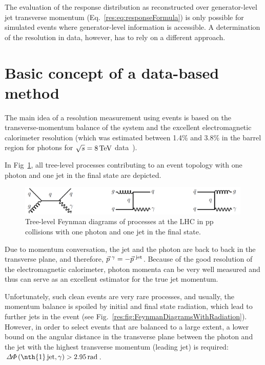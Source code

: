The evaluation of the response distribution as reconstructed over generator-level jet transverse momentum (Eq.~\eqref{res:eq:responseFormula})
is only possible for simulated events where generator-level information is accessible. 
A determination of the resolution in data, however, has to rely on a different approach.\\


\section{Basic concept of a data-based method}
The main idea of a resolution measurement using \GAMJET events is based on the transverse-momentum balance of the \GAMJET system and the excellent electromagnetic calorimeter resolution
(which was estimated between 1.4\% and 3.8\% in the barrel region for photons for $\sqrt{s}=8\,\text{Te}\kern-0.06667em\text{V}$ data~\cite{bib:CMS:PhotonIdentification_8TeV}).

In Fig~\ref{res:fig:FeynmanDiagrams}, all tree-level processes contributing to an event topology with one photon and one jet in the final state are depicted. 
\begin{figure}[t]
  \centering
      \includegraphics[width=0.99\textwidth]{figures/resolution/generalApproach/FeynmanDiagram.pdf}
  \caption{Tree-level Feynman diagrams of processes at the LHC in pp collisions with one photon and one jet in the final state.}  
  \label{res:fig:FeynmanDiagrams}
\end{figure}
Due to momentum conversation, the jet and the photon are back to back in the transverse plane, and therefore, $\vec{p}^{\,\,\gamma} = -\vec{p}^{\,\,\text{jet}}$. 
Because of the good resolution of the electromagnetic calorimeter, photon momenta can be very well measured 
and thus can serve as an excellent estimator for the true jet momentum.


Unfortunately, such clean events are very rare processes, and usually, the momentum balance is spoiled by initial and final state radiation, which lead to further jets in the event 
(see Fig.~\ref{res:fig:FeynmanDiagramsWithRadiation}). 
However, in order to select events that are balanced to a large extent, a lower bound 
on the angular distance in the transverse plane between the photon and the jet with the highest transverse momentum (leading jet) is required: $\Delta\Phi \left(\text{\nth{1}\,jet,\,} \gamma \right)>2.95\,\unit{rad}$. 

